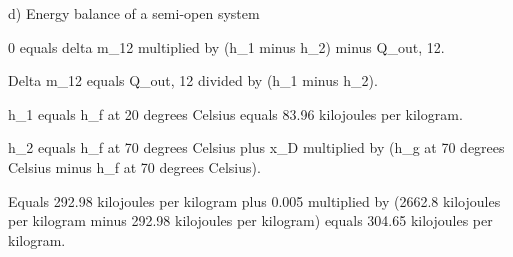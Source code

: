 d) Energy balance of a semi-open system

0 equals delta m_12 multiplied by (h_1 minus h_2) minus Q_out, 12.

Delta m_12 equals Q_out, 12 divided by (h_1 minus h_2).

h_1 equals h_f at 20 degrees Celsius equals 83.96 kilojoules per kilogram.

h_2 equals h_f at 70 degrees Celsius plus x_D multiplied by (h_g at 70 degrees Celsius minus h_f at 70 degrees Celsius).

Equals 292.98 kilojoules per kilogram plus 0.005 multiplied by (2662.8 kilojoules per kilogram minus 292.98 kilojoules per kilogram) equals 304.65 kilojoules per kilogram.